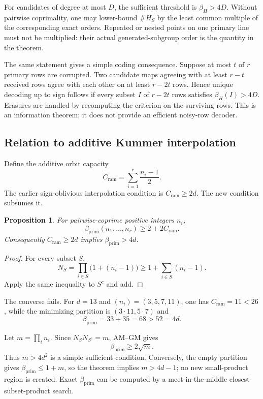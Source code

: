 \documentclass[11pt]{article}
\newtheorem{proposition}[theorem]{Proposition}
\newcommand{\Cr}{C_{\mathrm{ram}}}
\newcommand{\betaP}{\beta_{\mathrm{prim}}}
\begin{document}
For candidates of degree at most $D$, the sufficient threshold is
$\beta_H>4D$.  Without pairwise coprimality, one may lower-bound
$\#H_S$ by the least common multiple of the corresponding exact orders.
Repeated or nested points on one primary line must not be multiplied: their
actual generated-subgroup order is the quantity in the theorem.

The same statement gives a simple coding consequence.  Suppose at most $t$
of $r$ primary rows are corrupted.  Two candidate maps agreeing with at least
$r-t$ received rows agree with each other on at least $r-2t$ rows.  Hence
unique decoding up to sign follows if every subset $I$ of $r-2t$ rows
satisfies $\beta_H(I)>4D$.  Erasures are handled by recomputing the criterion
on the surviving rows.  This is an information theorem; it does not provide
an efficient noisy-row decoder.

\subsection{Relation to additive Kummer interpolation}

Define the additive orbit capacity
\[
 \Cr=\sum_{i=1}^r\frac{n_i-1}{2}.
\]
The earlier sign-oblivious interpolation condition is $\Cr\ge2d$.  The new
condition subsumes it.

\begin{proposition}\label{prop:additive}
For pairwise-coprime positive integers $n_i$,
\[
 \betaP(n_1,\ldots,n_r)\ge 2+2\Cr.
\]
Consequently $\Cr\ge2d$ implies $\betaP>4d$.
\end{proposition}

\begin{proof}
For every subset $S$,
\[
 N_S=\prod_{i\in S}\bigl(1+(n_i-1)\bigr)
 \ge 1+\sum_{i\in S}(n_i-1).
\]
Apply the same inequality to $S^c$ and add.
\end{proof}

The converse fails.  For $d=13$ and
$(n_i)=(3,5,7,11)$, one has $\Cr=11<26$, while the minimizing
partition is $(3\cdot11,5\cdot7)$ and
\[
 \betaP=33+35=68>52=4d.
\]

Let $m=\prod_i n_i$.  Since $N_SN_{S^c}=m$, AM--GM gives
\begin{equation}\label{eq:product-bound}
 \betaP\ge2\sqrt m.
\end{equation}
Thus $m>4d^2$ is a simple sufficient condition.  Conversely, the empty
partition gives $\betaP\le1+m$, so the theorem implies $m>4d-1$; no new
small-product region is created.  Exact $\betaP$ can be computed by a
meet-in-the-middle closest-subset-product search.
\end{document}
